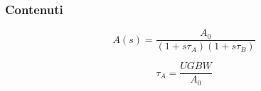 \documentclass{beamer}
\begin{document}
\begin{frame}
    \frametitle{Contenuti}
    
    \begin{equation}
        A(s) = \dfrac{A_0}{\left(1+s\tau_A\right)\left(1+s\tau_B\right)}
    \end{equation}

    \begin{equation}
        \tau_A = \dfrac{UGBW}{A_0}
    \end{equation}

\end{frame}
\end{document}
